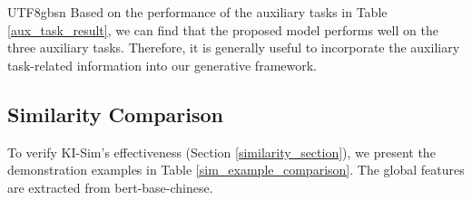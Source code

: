 \documentclass[runningheads]{llncs}
\newcommand{\ccks}[1]{\textcolor{red}{#1}}
\begin{document}
\begin{CJK*}{UTF8}{gbsn}
Based on the performance of the auxiliary tasks in Table \ref{aux_task_result}, we can find that the proposed model performs well on the three auxiliary tasks. 
Therefore, it is generally useful to incorporate the auxiliary task-related information into our generative framework.


\subsection{Similarity Comparison}
\label{similarity_compare_section}


To verify KI-Sim's effectiveness (Section \ref{similarity_section}), we present the demonstration examples in Table \ref{sim_example_comparison}. 
The global features are extracted from \textsf{bert-base-chinese}.





     

\end{CJK*}
\end{document}
